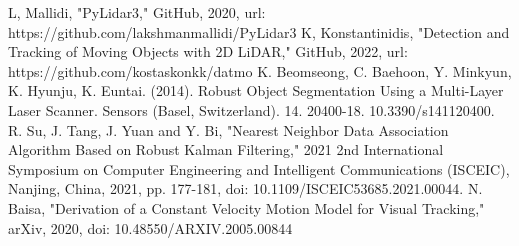 \documentclass[journal]{IEEEtran} %
\begin{document}
\begin{thebibliography}{00}
     L, Mallidi, "PyLidar3," GitHub, 2020, url: https://github.com/lakshmanmallidi/PyLidar3
     K, Konstantinidis, "Detection and Tracking of Moving Objects with 2D LiDAR," GitHub, 2022, url: https://github.com/kostaskonkk/datmo
     K. Beomseong, C. Baehoon, Y. Minkyun, K. Hyunju, K. Euntai. (2014). Robust Object Segmentation Using a Multi-Layer Laser Scanner. Sensors (Basel, Switzerland). 14. 20400-18. 10.3390/s141120400. 
     R. Su, J. Tang, J. Yuan and Y. Bi, "Nearest Neighbor Data Association Algorithm Based on Robust Kalman Filtering," 2021 2nd International Symposium on Computer Engineering and Intelligent Communications (ISCEIC), Nanjing, China, 2021, pp. 177-181, doi: 10.1109/ISCEIC53685.2021.00044.
     N. Baisa, "Derivation of a Constant Velocity Motion Model for Visual Tracking," arXiv, 2020, doi: 10.48550/ARXIV.2005.00844

\end{thebibliography}
\end{document}
